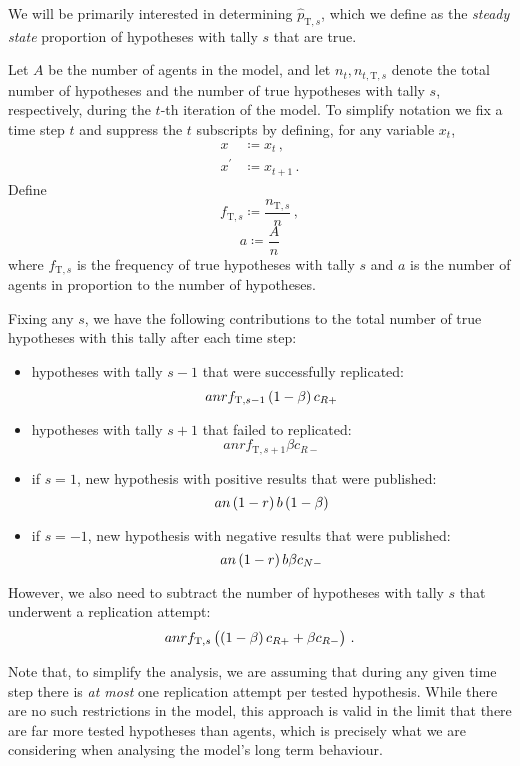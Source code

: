 \documentclass{article}
\newcommand{\tT}{\text{T}}
\begin{document}
We will be primarily interested in determining $\hat{p}_{\tT,s}$, which
we define as the \textit{steady state} proportion of hypotheses with
tally $s$ that are true.

Let $A$ be the number of agents in the model, and let
$n_t, n_{t, \tT, s}$ denote the total number of hypotheses and the
number of true hypotheses with tally $s$, respectively, during the
$t$-th iteration of the model. To simplify notation we fix a time step
$t$ and suppress the $t$ subscripts by defining, for any variable $x_t$,
%
\begin{align*}
    x &\coloneqq x_t \,, \\
    x^\prime &\coloneqq x_{t + 1}
    \,.
\end{align*}
%
Define $$f_{\tT, s} \coloneqq \frac{n_{\tT, s}}{n}\,,$$ $$a \coloneqq \frac{A}{n}$$
where $f_{\tT, s}$ is the frequency of true hypotheses with tally $s$
and $a$ is the number of agents in proportion to the number of
hypotheses.

Fixing any $s$, we have the following contributions to the total number
of true hypotheses with this tally after each time step:

\begin{itemize}
    \item hypotheses with tally $s - 1$ that were successfully
        replicated:
        $$a n r f_{\tT, s - 1} \del{1 - \beta} c_{R +}$$
    \item hypotheses with tally $s + 1$ that failed to replicated:
        $$a n r f_{\tT, s + 1} \beta c_{R -}$$
    \item if $s = 1$, new hypothesis with positive results that were
        published:
        $$a n \del{1 - r} b \del{1 - \beta}$$
    \item if $s = -1$, new hypothesis with negative results that were
        published:
        $$a n \del{1 - r} b \beta c_{N -}$$
\end{itemize}

However, we also need to subtract the number of hypotheses with tally
$s$ that underwent a replication attempt:
$$a n r f_{\tT, s} \del{\del{1 - \beta} c_{R +} + \beta c_{R -}}\,.$$

Note that, to simplify the analysis, we are assuming that during any
given time step there is \textit{at most} one replication attempt per
tested hypothesis. While there are no such restrictions in the model,
this approach is valid in the limit that there are far more tested
hypotheses than agents, which is precisely what we are considering when
analysing the model's long term behaviour.
\end{document}
